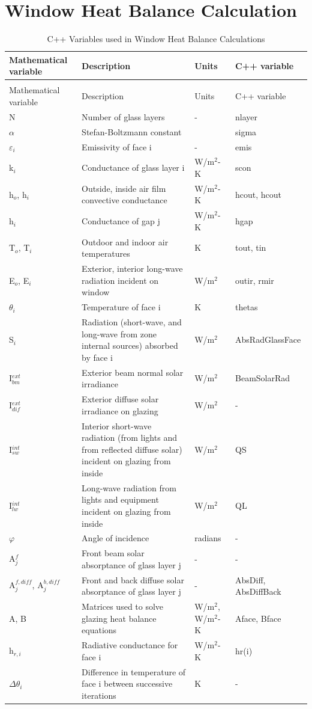 \section{Window Heat Balance Calculation}\label{window-heat-balance-calculation}

\begin{longtable}[c]{p{1.0in}p{2.5in}p{1.0in}p{1.5in}}
\caption{C++ Variables used in Window Heat Balance Calculations \label{table:c++-variables-used-in-window-heat-balance}} \tabularnewline
\toprule 
Mathematical variable & Description & Units & C++ variable \tabularnewline
\midrule
\endfirsthead

\caption[]{C++ Variables used in Window Heat Balance Calculations} \tabularnewline
\toprule 
Mathematical variable & Description & Units & C++ variable \tabularnewline
\midrule
\endhead

N & Number of glass layers & - & nlayer \tabularnewline
$\alpha$ & Stefan-Boltzmann constant & ~ & sigma \tabularnewline 
$\varepsilon$\(_{i}\) & Emissivity of face i & - & emis \tabularnewline
k\(_{i}\) & Conductance of glass layer i & W/m\(^{2}\)-K & scon \tabularnewline
h\(_{o}\), h\(_{i}\) & Outside, inside air film convective conductance & W/m\(^{2}\)-K & hcout, hcout \tabularnewline
h\(_{i}\) & Conductance of gap j & W/m\(^{2}\)-K & hgap \tabularnewline
T\(_{o}\), T\(_{i}\) & Outdoor and indoor air temperatures & K & tout, tin \tabularnewline
E\(_{o}\), E\(_{i}\) & Exterior, interior long-wave radiation incident on window & W/m\(^{2}\) & outir, rmir \tabularnewline
$\theta$\(_{i}\) & Temperature of face i & K & thetas \tabularnewline
S\(_{i}\) & Radiation (short-wave, and long-wave from zone internal sources) absorbed by face i & W/m\(^{2}\) & AbsRadGlassFace \tabularnewline
I\(^{ext}_{bm}\) & Exterior beam normal solar irradiance & W/m\(^{2}\) & BeamSolarRad \tabularnewline
I\(^{ext}_{dif}\) & Exterior diffuse solar irradiance on glazing & W/m\(^{2}\) & - \tabularnewline
I\(^{int}_{sw}\) & Interior short-wave radiation (from lights and from reflected diffuse solar) incident on glazing from inside & W/m\(^{2}\) & QS \tabularnewline
I\(^{int}_{lw}\) & Long-wave radiation from lights and equipment incident on glazing from inside & W/m\(^{2}\) & QL \tabularnewline
$\varphi$ & Angle of incidence & radians & - \tabularnewline
A\(^{f}_{j}\) & Front beam solar absorptance of glass layer j & - & - \tabularnewline
A\(^{f,diff}_{j}\), A\(^{b,diff}_{j}\) & Front and back diffuse solar absorptance of glass layer j & - & AbsDiff, AbsDiffBack \tabularnewline
A, B & Matrices used to solve glazing heat balance equations & W/m\(^{2}\), W/m\(^{2}\)-K & Aface, Bface \tabularnewline
h\(_{r,i}\) & Radiative conductance for face i & W/m\(^{2}\)-K & hr(i) \tabularnewline
$\Delta\theta$\(_{i}\) & Difference in temperature of face i between successive iterations & K & - \tabularnewline
\bottomrule
\end{longtable}

